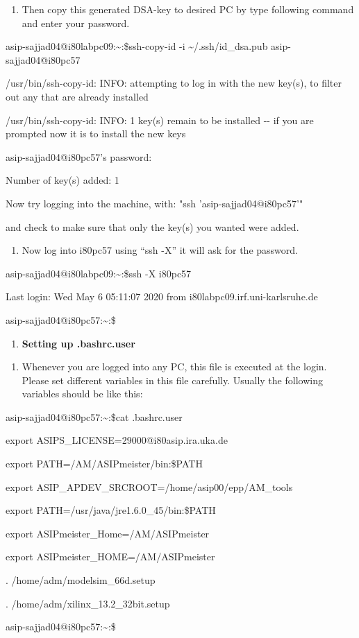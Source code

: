 \begin{enumerate}
	\def\labelenumi{\arabic{enumi}.}
	\setcounter{enumi}{10}
	\item
	Then copy this generated DSA-key to desired PC by type following
	command and enter your password.
\end{enumerate}

asip-sajjad04@i80labpc09:\textasciitilde:\$ssh-copy-id -i
\textasciitilde/.ssh/id\_dsa.pub asip-sajjad04@i80pc57

/usr/bin/ssh-copy-id: INFO: attempting to log in with the new key(s), to
filter out any that are already installed

/usr/bin/ssh-copy-id: INFO: 1 key(s) remain to be installed -\/- if you
are prompted now it is to install the new keys

asip-sajjad04@i80pc57's password:

Number of key(s) added: 1

Now try logging into the machine, with: "ssh 'asip-sajjad04@i80pc57'"

and check to make sure that only the key(s) you wanted were added.

\begin{enumerate}
	\def\labelenumi{\arabic{enumi}.}
	\setcounter{enumi}{11}
	\item
	Now log into i80pc57 using ``ssh -X'' it will ask for the password.
\end{enumerate}

asip-sajjad04@i80labpc09:\textasciitilde:\$ssh -X i80pc57

Last login: Wed May 6 05:11:07 2020 from i80labpc09.irf.uni-karlsruhe.de

asip-sajjad04@i80pc57:\textasciitilde:\$

\begin{enumerate}
	\def\labelenumi{\Alph{enumi}.}
	\setcounter{enumi}{9}
	\item
	\textbf{Setting up .bashrc.user}
\end{enumerate}

\begin{enumerate}
	\def\labelenumi{\arabic{enumi}.}
	\setcounter{enumi}{12}
	\item
	Whenever you are logged into any PC, this file is executed at the
	login. Please set different variables in this file carefully. Usually
	the following variables should be like this:
\end{enumerate}

asip-sajjad04@i80pc57:\textasciitilde:\$cat .bashrc.user

export ASIPS\_LICENSE=29000@i80asip.ira.uka.de

export PATH=/AM/ASIPmeister/bin:\$PATH

export ASIP\_APDEV\_SRCROOT=/home/asip00/epp/AM\_tools

export PATH=/usr/java/jre1.6.0\_45/bin:\$PATH

export ASIPmeister\_Home=/AM/ASIPmeister

export ASIPmeister\_HOME=/AM/ASIPmeister

. /home/adm/modelsim\_66d.setup

. /home/adm/xilinx\_13.2\_32bit.setup

asip-sajjad04@i80pc57:\textasciitilde:\$
